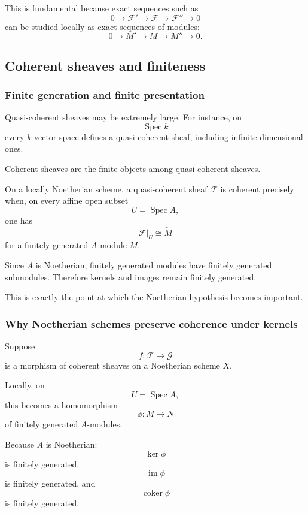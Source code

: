 \documentclass[12pt,a4paper]{article}
\DeclareMathOperator{\im}{im}
\DeclareMathOperator{\coker}{coker}
\DeclareMathOperator{\Spec}{Spec}
\providecommand{\Spec}{\operatorname{Spec}}
\theoremstyle{notespace}
\begin{document}
This is fundamental because exact sequences such as
\[
0\longrightarrow\mathcal{F}'
\longrightarrow\mathcal{F}
\longrightarrow\mathcal{F}''
\longrightarrow 0
\]
can be studied locally as exact sequences of modules:
\[
0\longrightarrow M'
\longrightarrow M
\longrightarrow M''
\longrightarrow 0.
\]

\subsection{Coherent sheaves and finiteness}

\subsubsection{Finite generation and finite presentation}

Quasi-coherent sheaves may be extremely large. For instance, on
\[
\Spec k
\]
every \(k\)-vector space defines a quasi-coherent sheaf, including infinite-dimensional ones.

Coherent sheaves are the finite objects among quasi-coherent sheaves.

On a locally Noetherian scheme, a quasi-coherent sheaf \(\mathcal{F}\) is coherent precisely when, on every affine open subset
\[
U=\Spec A,
\]
one has
\[
\mathcal{F}|_U\cong\widetilde{M}
\]
for a finitely generated \(A\)-module \(M\).

Since \(A\) is Noetherian, finitely generated modules have finitely generated submodules. Therefore kernels and images remain finitely generated.

This is exactly the point at which the Noetherian hypothesis becomes important.

\subsubsection{Why Noetherian schemes preserve coherence under kernels}

Suppose
\[
f:\mathcal{F}\longrightarrow\mathcal{G}
\]
is a morphism of coherent sheaves on a Noetherian scheme \(X\).

Locally, on
\[
U=\Spec A,
\]
this becomes a homomorphism
\[
\phi:M\longrightarrow N
\]
of finitely generated \(A\)-modules.

Because \(A\) is Noetherian:
\[
\ker\phi
\]
is finitely generated,
\[
\im\phi
\]
is finitely generated, and
\[
\coker\phi
\]
is finitely generated.
\end{document}
